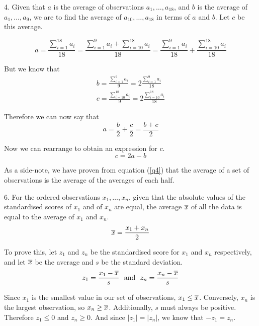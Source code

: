 \documentclass[fleqn]{article}
\begin{document}
\begin{answers}
	\item[4.]
	Given that \(a\) is the average of observations \(a_1, \dots, a_{18}\), and \(b\) is the average of \(a_1, \dots, a_9\), we are to find the average of \(a_{10}, \dots, a_{18}\) in terms of \(a\) and \(b\). Let \(c\) be this average.

	\[a = \frac{\sum_{i=1}^{18}a_i}{18} = \frac{\sum_{i=1}^{9}a_i + \sum_{i=10}^{18}a_i}{18} = \frac{\sum_{i=1}^{9}a_i}{18} + \frac{\sum_{i=10}^{18}a_i}{18}\]

	But we know that
	\begin{gather}
		b = \frac{\sum_{i=1}^{9}a_i}{9} = 2 \frac{\sum_{i=1}^{9}a_i}{18} \\
		c = \frac{\sum_{i=10}^{18}a_i}{9} = 2 \frac{\sum_{i=10}^{18}a_i}{18}
	\end{gather}

	Therefore we can now say that
	\begin{equation}
		a = \frac{b}{2} + \frac{c}{2} = \frac{b + c}{2} \label{q4}
	\end{equation}

	Now we can rearrange to obtain an expression for \(c\).
	\[c = 2a - b\]

	As a side-note, we have proven from equation (\ref{q4}) that the average of a set of observations is the average of the averages of each half.

	\item[6.]
	For the ordered observations \(x_1, \dots, x_n\), given that the absolute values of the standardised scores of \(x_1\) and of \(x_n\) are equal, the average \(\overline{x}\) of all the data is equal to the average of \(x_1\) and \(x_n\).
	\begin{equation}
		\overline{x} = \frac{x_1 + x_n}{2} \label{q6-x-bar}
	\end{equation}

	To prove this, let \(z_1\) and \(z_n\) be the standardised score for \(x_1\) and \(x_n\) respectively, and let \(\overline{x}\) be the average and \(s\) be the standard deviation.
	\begin{equation}
		z_1 = \frac{x_1 - \overline{x}}{s} \ \text{ and } \ z_n = \frac{x_n - \overline{x}}{s} \label{q6-z}
	\end{equation}

	Since \(x_1\) is the smallest value in our set of observations, \(x_1 \leq \overline{x}\). Conversely, \(x_n\) is the largest observation, so \(x_n \geq \overline{x}\). Additionally, \(s\) must always be positive. Therefore \(z_1 \leq 0\) and \(z_n \geq 0\). And since \(|z_1| = |z_n|\), we know that \(-z_1 = z_n\).


\end{answers}
\end{document}

